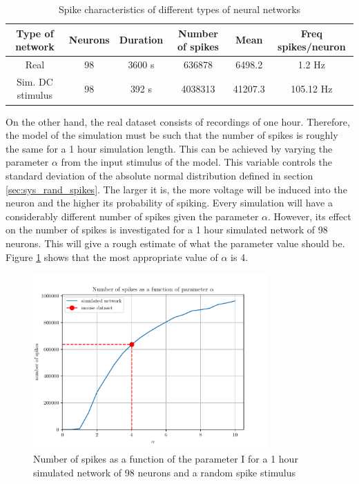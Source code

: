 \begin{table}[]
\centering
\begin{tabular}{|c|c|c|c|c|c|}
\hline
Type of network  & Neurons & Duration & Number of spikes & Mean    & Freq spikes/neuron \\ \hline
Real             & 98                & 3600 s           & 636878           & 6498.2  & 1.2 Hz               \\ \hline
Sim. DC stimulus & 98                & 392 s            & 4038313          & 41207.3 & 105.12 Hz            \\ \hline
\end{tabular}
\caption{Spike characteristics of different types of neural networks}
\label{tab:spike_characteristics}
\end{table}

On the other hand, the real dataset consists of recordings of one hour. Therefore, the model of the simulation must be such that the number of spikes is roughly the same for a 1 hour simulation length. This can be achieved by varying the parameter \(\alpha\) from the input stimulus of the model. This variable controls the standard deviation of the absolute normal distribution defined in section \ref{sec:sys_rand_spikes}. The larger it is, the more voltage will be induced into the neuron and the higher its probability of spiking.
Every simulation will have a considerably different number of spikes given the parameter \(\alpha\). However, its effect on the number of spikes is investigated for a 1 hour simulated network of 98 neurons. This will give a rough estimate of what the parameter value should be. Figure \ref{fig:I_var_plot} shows that the most appropriate value of \(\alpha\) is 4. 

\begin{figure}[H]
	\centering
	\includegraphics[width=0.8\textwidth]{I_var_plot.pdf}
	\caption{Number of spikes as a function of the parameter I for a 1 hour simulated network of 98 neurons and a random spike stimulus}
	\label{fig:I_var_plot}
\end{figure}


